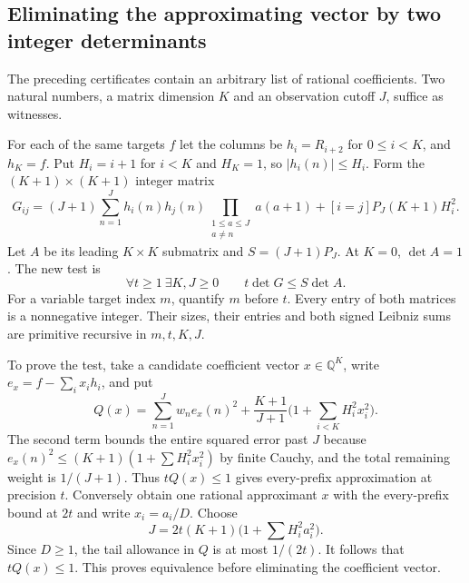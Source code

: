 \subsection{Eliminating the approximating vector by two integer determinants}
The preceding certificates contain an arbitrary list of rational coefficients.
Two natural numbers, a matrix dimension $K$ and an observation cutoff $J$, suffice as witnesses.

For each of the same targets $f$ let the columns be
$h_i=R_{i+2}$ for $0\le i<K$, and $h_K=f$. Put
$H_i=i+1$ for $i<K$ and $H_K=1$, so $|h_i(n)|\le H_i$. Form the
$(K+1)\times(K+1)$ integer matrix
\[
 G_{ij}=(J+1)\sum_{n=1}^J h_i(n)h_j(n)
              \prod_{\substack{1\le a\le J\\a\ne n}}a(a+1)
       +[i=j]P_J(K+1)H_i^2.
\]
Let $A$ be its leading $K\times K$ submatrix and
$S=(J+1)P_J$. At $K=0$, $\det A=1$. The new test is
\[
 \boxed{\qquad \forall t\ge1\ \exists K,J\ge0\qquad
                   t\det G\le S\det A.\qquad}
\]
For a variable target index $m$, quantify $m$ before $t$. Every entry
of both matrices is a nonnegative integer. Their sizes, their entries
and both signed Leibniz sums are primitive recursive in $m,t,K,J$.

To prove the test, take a candidate coefficient vector $x\in\mathbb Q^K$,
write $e_x=f-\sum_i x_ih_i$, and put
\[
 Q(x)=\sum_{n=1}^J w_ne_x(n)^2+
            \frac{K+1}{J+1}\Big(1+\sum_{i<K}H_i^2x_i^2\Big).
\]
The second term bounds the entire squared error past $J$ because
$e_x(n)^2\le(K+1)(1+\sum H_i^2 x_i^2)$ by finite Cauchy, and the
total remaining weight is $1/(J+1)$. Thus $t Q(x)\le1$ gives
every-prefix approximation at precision $t$.
Conversely obtain one rational approximant $x$ with the every-prefix
bound at $2t$ and write $x_i=a_i/D$. Choose
\[
   J=2t(K+1)\Big(1+\sum H_i^2 a_i^2\Big).
\]
Since $D\ge1$, the tail allowance in $Q$ is at most $1/(2t)$.
It follows that $tQ(x)\le1$. This proves equivalence before eliminating
the coefficient vector.

